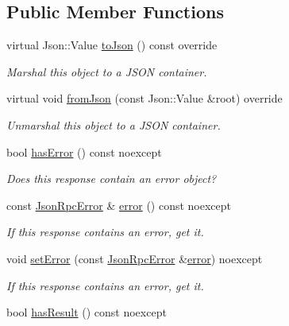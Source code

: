 \subsection*{Public Member Functions}
\begin{DoxyCompactItemize}
\item 
virtual Json\+::\+Value \hyperlink{classdg_1_1deepcore_1_1network_1_1_json_rpc_response_aaa56d4f6a634774f8d5f6e91c547fb84}{to\+Json} () const override
\begin{DoxyCompactList}\small\item\em Marshal this object to a J\+S\+ON container. \end{DoxyCompactList}\item 
virtual void \hyperlink{classdg_1_1deepcore_1_1network_1_1_json_rpc_response_aa07ab7d8e7068333a54397e71aa2e06b}{from\+Json} (const Json\+::\+Value \&root) override
\begin{DoxyCompactList}\small\item\em Unmarshal this object to a J\+S\+ON container. \end{DoxyCompactList}\item 
bool \hyperlink{group___network_module_gaf86a4b609361bdbee6d2bad26ef43c71}{has\+Error} () const noexcept
\begin{DoxyCompactList}\small\item\em Does this response contain an error object? \end{DoxyCompactList}\item 
const \hyperlink{classdg_1_1deepcore_1_1network_1_1_json_rpc_error}{Json\+Rpc\+Error} \& \hyperlink{group___network_module_ga7a8d72cacfd617c8aa04d3ef973e3d19}{error} () const noexcept
\begin{DoxyCompactList}\small\item\em If this response contains an error, get it. \end{DoxyCompactList}\item 
void \hyperlink{group___network_module_ga47913460de543d08ee67b2d263a49b37}{set\+Error} (const \hyperlink{classdg_1_1deepcore_1_1network_1_1_json_rpc_error}{Json\+Rpc\+Error} \&\hyperlink{group___network_module_ga7a8d72cacfd617c8aa04d3ef973e3d19}{error}) noexcept
\begin{DoxyCompactList}\small\item\em If this response contains an error, get it. \end{DoxyCompactList}\item 
bool \hyperlink{group___network_module_ga6bce2bddf5eb24775a682dd8078d1392}{has\+Result} () const noexcept

\end{DoxyCompactItemize}
